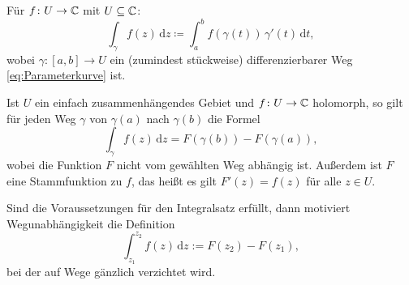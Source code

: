 \begin{definition}[Kurvenintegral]
Für $f\colon U\to\mathbb C$ mit $U\subseteq\mathbb C$:%
\begin{equation}
\int_\gamma f(z)\,\mathrm dz
\coloneq\int_a^b f(\gamma(t))\,\gamma'(t)\,\mathrm dt,
\end{equation}
wobei $\gamma\colon [a,b]\to U$ ein (zumindest stückweise)
differenzierbarer Weg \eqref{eq:Parameterkurve} ist.
\end{definition}

\noindent
{}
Ist $U$ ein einfach zusammenhängendes Gebiet und $f\colon U\to\mathbb C$
holomorph, so gilt für jeden Weg $\gamma$ von $\gamma(a)$ nach
$\gamma(b)$ die Formel%
\begin{equation}
\int_\gamma f(z)\,\mathrm dz = F(\gamma(b))-F(\gamma(a)),
\end{equation}
wobei die Funktion $F$ nicht vom gewählten Weg abhängig ist.
Außerdem ist $F$ eine Stammfunktion zu $f$, das heißt es gilt
$F'(z)=f(z)$ für alle $z\in U$.

Sind die Voraussetzungen für den Integralsatz erfüllt,
dann motiviert Wegunabhängigkeit die Definition%
\begin{equation}
\int_{z_1}^{z_2} f(z)\,\mathrm dz := F(z_2)-F(z_1),
\end{equation}
bei der auf Wege gänzlich verzichtet wird.

